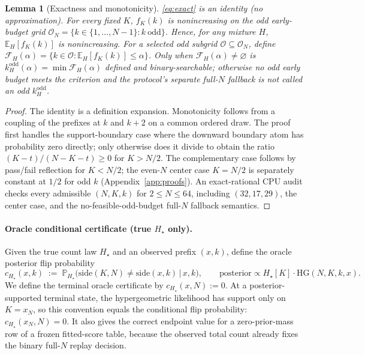 \documentclass{article}
\newtheorem{lemma}{Lemma}
\theoremstyle{definition}
\theoremstyle{remark}
\newcommand{\trueH}{H_\star}
\newcommand{\oraclecert}{c_{\trueH}}
\newcommand{\HG}{\mathrm{HG}}
\newcommand{\E}{\mathbb{E}}
\renewcommand{\P}{\mathbb{P}}
\begin{document}
\begin{lemma}[Exactness and monotonicity]
\label{lem:exact}
\eqref{eq:exact} is an identity (no approximation). For every fixed $K$,
$f_K(k)$ is nonincreasing on the odd early-budget grid
$\mathcal O_N=\{k\in\{1,\ldots,N-1\}:k\ \mathrm{odd}\}$. Hence, for any
mixture $H$, $\E_H[f_K(k)]$ is nonincreasing.  For a selected odd subgrid
$\mathcal O\subseteq\mathcal O_N$, define
$\mathcal F_H(\alpha)=\{k\in\mathcal O:\E_H[f_K(k)]\le\alpha\}$. Only when
$\mathcal F_H(\alpha)\ne\varnothing$ is
$k_H^{\mathrm{odd}}(\alpha)=\min\mathcal F_H(\alpha)$ defined and
binary-searchable; otherwise no odd early budget meets the criterion and the
protocol's separate full-$N$ fallback is not called an odd
$k_H^{\mathrm{odd}}$.
\end{lemma}
\begin{proof}
The identity is a definition expansion. Monotonicity follows from a
coupling of the prefixes at $k$ and $k{+}2$ on a common ordered draw.  The
proof first handles the support-boundary case where the downward boundary atom
has probability zero directly; only otherwise does it divide to obtain the
ratio $(K-t)/(N-K-t)\ge0$ for $K>N/2$. The complementary case follows by
pass/fail reflection for $K<N/2$; the even-$N$ center case $K=N/2$ is
separately constant at $1/2$ for odd $k$ (Appendix~\ref{app:proofs}). An
exact-rational CPU audit checks every admissible $(N,K,k)$ for $2\le N\le64$,
including $(32,17,29)$, the center case, and the no-feasible-odd-budget
full-$N$ fallback semantics.
\end{proof}

\paragraph{Oracle conditional certificate (true $\trueH$ only).}
Given the true count law $\trueH$ and an observed prefix $(x,k)$, define the
oracle posterior flip probability
\begin{equation}
\oraclecert(x,k) \;:=\; \P_{\trueH}\big(\mathrm{side}(K,N)\neq\mathrm{side}(x,k)\,\big|\,x,k\big),
\qquad \text{posterior} \propto \trueH[K]\cdot\HG(N,K,k,x).
\label{eq:cond}
\end{equation}
We define the terminal oracle certificate by $\oraclecert(x,N):=0$. At a
posterior-supported terminal state, the hypergeometric likelihood has support
only on $K=x_N$, so this convention equals the conditional flip probability:
$\oraclecert(x_N,N)=0$. It also gives the correct endpoint value for a
zero-prior-mass row of a frozen fitted-score table, because the observed total
count already fixes the binary full-$N$ replay decision.
\end{document}
